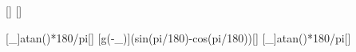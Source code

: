 [\mpss]
[\degree]

[\arctan\mu_]{atan(\muGX)*180/pi}[\degree]
[g\left(\sin\beta-\mu_\cos\beta\right)]{\gEX*(sin(\wiBX*pi/180)-\muGX*cos(\wiBX*pi/180))}[\mpss]
[\arctan\mu_]{atan(\muHX)*180/pi}[\degree]
